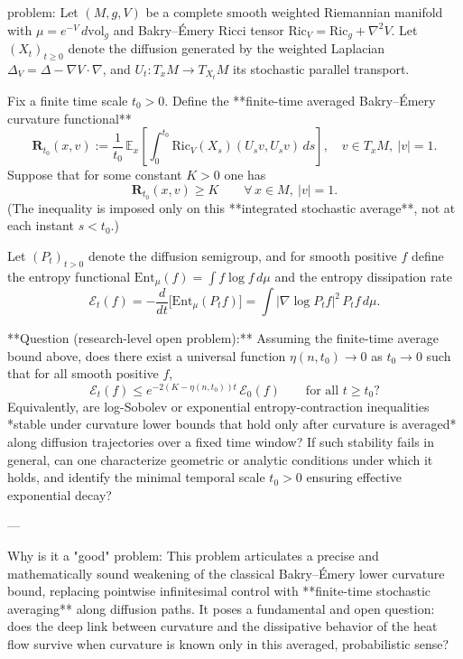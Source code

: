 problem:  
Let \((M,g,V)\) be a complete smooth weighted Riemannian manifold with \(\mu=e^{-V}\,d\mathrm{vol}_g\) and Bakry–Émery Ricci tensor \(\mathrm{Ric}_V=\mathrm{Ric}_g+\nabla^2V\).  
Let \((X_t)_{t\ge0}\) denote the diffusion generated by the weighted Laplacian \(\Delta_V=\Delta-\nabla V\cdot\nabla\), and \(U_t:T_xM\to T_{X_t}M\) its stochastic parallel transport.  

Fix a finite time scale \(t_0>0\).  
Define the **finite-time averaged Bakry–Émery curvature functional**  
\[
\mathbf{R}_{t_0}(x,v)
:= \frac{1}{t_0}\,\mathbb{E}_x\!\left[\int_0^{t_0} \mathrm{Ric}_V(X_s)(U_s v,U_s v)\, ds \right],
\quad v\in T_xM,\ |v|=1.
\]
Suppose that for some constant \(K>0\) one has  
\[
\mathbf{R}_{t_0}(x,v)\ge K
\qquad\forall\,x\in M,\ |v|=1.
\]
(The inequality is imposed only on this **integrated stochastic average**, not at each instant \(s<t_0\).)

Let \((P_t)_{t>0}\) denote the diffusion semigroup, and for smooth positive \(f\) define the entropy functional  
\(\mathrm{Ent}_\mu(f)=\int f\log f\,d\mu\)  
and the entropy dissipation rate  
\[
\mathcal{E}_t(f)=-\frac{d}{dt}\big[\mathrm{Ent}_\mu(P_t f)\big]
   = \int |\nabla \log P_t f|^2\,P_t f\,d\mu.
\]

**Question (research-level open problem):**  
Assuming the finite-time average bound above, does there exist a universal function \(\eta(n,t_0)\to0\) as \(t_0\to0\) such that for all smooth positive \(f\),
\[
\mathcal{E}_t(f)
   \le e^{-2(K-\eta(n,t_0))t}\,\mathcal{E}_0(f)
   \qquad \text{for all }t\ge t_0?
\]
Equivalently, are log-Sobolev or exponential entropy-contraction inequalities *stable under curvature lower bounds that hold only after curvature is averaged* along diffusion trajectories over a fixed time window?  
If such stability fails in general, can one characterize geometric or analytic conditions under which it holds, and identify the minimal temporal scale \(t_0>0\) ensuring effective exponential decay?

---

Why is it a "good" problem:  
This problem articulates a precise and mathematically sound weakening of the classical Bakry–Émery lower curvature bound, replacing pointwise infinitesimal control with **finite-time stochastic averaging** along diffusion paths.  
It poses a fundamental and open question: does the deep link between curvature and the dissipative behavior of the heat flow survive when curvature is known only in this averaged, probabilistic sense?  

